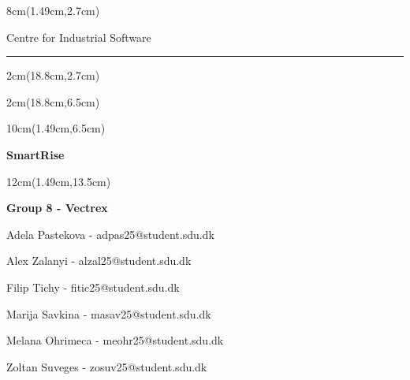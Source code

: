 \begin{titlepage}

\pagecolor{titlebg}

\begin{textblock*}{8cm}(1.49cm,2.7cm)

{\fontsize{12pt}{14pt}\selectfont
\color{cisgray}
Centre for Industrial Software}

\vspace{-0.10cm}

{\color{cisgray}\rule{5.5cm}{2pt}}

\end{textblock*}

\begin{textblock*}{2cm}(18.8cm,2.7cm)

{\fontsize{12pt}{14pt}\selectfont
\color{cisgray}
}

\end{textblock*}

\begin{textblock*}{2cm}(18.8cm,6.5cm)

{\fontsize{12pt}{14pt}\selectfont
\color{cisgray}
}

\end{textblock*}


\begin{textblock*}{10cm}(1.49cm,6.5cm)

{\fontsize{36pt}{43pt}\selectfont\bfseries
SmartRise
}
\end{textblock*}

\begin{textblock*}{12cm}(1.49cm,13.5cm)

{\fontsize{12pt}{14pt}\selectfont\bfseries
Group 8 - Vectrex}

\vspace{0.1cm}

{\fontsize{12pt}{14pt}\selectfont
Adela Pastekova - adpas25@student.sdu.dk\par
Alex Zalanyi - alzal25@student.sdu.dk\par
Filip Tichy - fitic25@student.sdu.dk\par
Marija Savkina - masav25@student.sdu.dk\par
Melana Ohrimeca - meohr25@student.sdu.dk\par
Zoltan Suveges - zosuv25@student.sdu.dk\par
}

\vspace{1cm}


\end{textblock*}
\end{titlepage}
